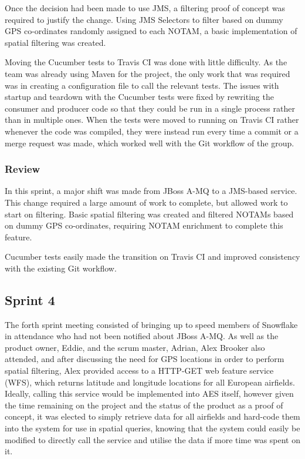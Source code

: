 \documentclass[a4paper, 12pt, twoside]{article}
\begin{document}
Once the decision had been made to use JMS, a filtering proof of concept was required to justify the change. Using JMS Selectors to filter based on dummy GPS co-ordinates randomly assigned to each NOTAM, a basic implementation of spatial filtering was created.

Moving the Cucumber tests to Travis CI was done with little difficulty. As the team was already using Maven for the project, the only work that was required was in creating a configuration file to call the relevant tests. The issues with startup and teardown with the Cucumber tests were fixed by rewriting the consumer and producer code so that they could be run in a single process rather than in multiple ones. When the tests were moved to running on Travis CI rather whenever the code was compiled, they were instead run every time a commit or a merge request was made, which worked well with the Git workflow of the group.

\subsubsection{Review}

In this sprint, a major shift was made from JBoss A-MQ to a JMS-based service. This change required a large amount of work to complete, but allowed work to start on filtering. Basic spatial filtering was created and filtered NOTAMs based on dummy GPS co-ordinates, requiring NOTAM enrichment to complete this feature.

Cucumber tests easily made the transition on Travis CI and improved consistency with the existing Git workflow.

\subsection{Sprint 4}
\label{sec:impl_sprint_4}

The forth sprint meeting consisted of bringing up to speed members of Snowflake in attendance who had not been notified about JBoss A-MQ. As well as the product owner, Eddie, and the scrum master, Adrian, Alex Brooker also attended, and after discussing the need for GPS locations in order to perform spatial filtering, Alex provided access to a HTTP-GET web feature service (WFS), which returns latitude and longitude locations for all European airfields. Ideally, calling this service would be implemented into AES itself, however given the time remaining on the project and the status of the product as a proof of concept, it was elected to simply retrieve data for all airfields and hard-code them into the system for use in spatial queries, knowing that the system could easily be modified to directly call the service and utilise the data if more time was spent on it.
\end{document}

